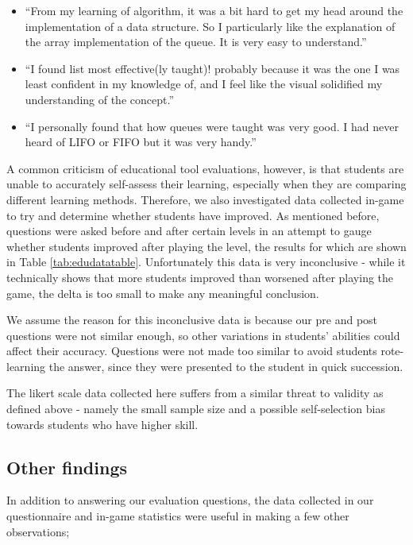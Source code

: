 \documentclass[11pt]{article}
\begin{document}
\begin{spacing}{1.5}
\begin{itemize}
  \item ``From my learning of algorithm, it was a bit hard to get my head around the implementation of a data structure. So I particularly like the explanation of the array implementation of the queue. It is very easy to understand.''
  \item ``I found list most effective(ly taught)! probably because it was the one I was least confident in my knowledge of, and I feel like the visual solidified my understanding of the concept.''
  \item ``I personally found that how queues were taught was very good. I had never heard of LIFO or FIFO but it was very handy.''
\end{itemize}
\end{spacing}
A common criticism of educational tool evaluations, however, is that students are unable to accurately self-assess their learning, especially when they are comparing different learning methods\cite{Battistella}. Therefore, we also investigated data collected in-game to try and determine whether students have improved. As mentioned before, questions were asked before and after certain levels in an attempt to gauge whether students improved after playing the level, the results for which are shown in Table \ref{tab:edudatatable}. Unfortunately this data is very inconclusive - while it technically shows that more students improved than worsened after playing the game, the delta is too small to make any meaningful conclusion.\par
We assume the reason for this inconclusive data is because our pre and post questions were not similar enough, so other variations in students' abilities could affect their accuracy. Questions were not made too similar to avoid students rote-learning the answer, since they were presented to the student in quick succession.\par
The likert scale data collected here suffers from a similar threat to validity as defined above - namely the small sample size and a possible self-selection bias towards students who have higher skill.
\subsection{Other findings}
In addition to answering our evaluation questions, the data collected in our questionnaire and in-game statistics were useful in making a few other observations;
\end{document}
